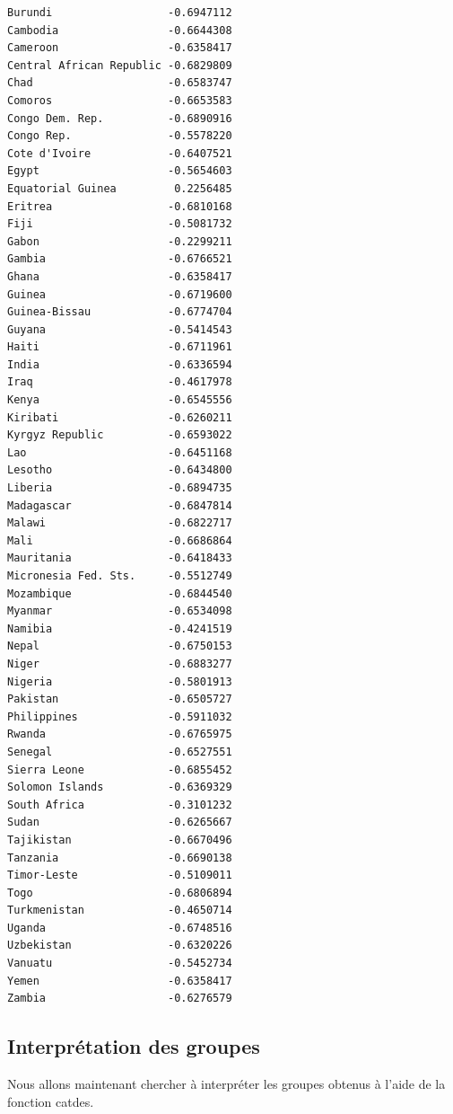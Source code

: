 \documentclass[
]{article}
\begin{document}
\begin{verbatim}
Burundi                  -0.6947112
Cambodia                 -0.6644308
Cameroon                 -0.6358417
Central African Republic -0.6829809
Chad                     -0.6583747
Comoros                  -0.6653583
Congo Dem. Rep.          -0.6890916
Congo Rep.               -0.5578220
Cote d'Ivoire            -0.6407521
Egypt                    -0.5654603
Equatorial Guinea         0.2256485
Eritrea                  -0.6810168
Fiji                     -0.5081732
Gabon                    -0.2299211
Gambia                   -0.6766521
Ghana                    -0.6358417
Guinea                   -0.6719600
Guinea-Bissau            -0.6774704
Guyana                   -0.5414543
Haiti                    -0.6711961
India                    -0.6336594
Iraq                     -0.4617978
Kenya                    -0.6545556
Kiribati                 -0.6260211
Kyrgyz Republic          -0.6593022
Lao                      -0.6451168
Lesotho                  -0.6434800
Liberia                  -0.6894735
Madagascar               -0.6847814
Malawi                   -0.6822717
Mali                     -0.6686864
Mauritania               -0.6418433
Micronesia Fed. Sts.     -0.5512749
Mozambique               -0.6844540
Myanmar                  -0.6534098
Namibia                  -0.4241519
Nepal                    -0.6750153
Niger                    -0.6883277
Nigeria                  -0.5801913
Pakistan                 -0.6505727
Philippines              -0.5911032
Rwanda                   -0.6765975
Senegal                  -0.6527551
Sierra Leone             -0.6855452
Solomon Islands          -0.6369329
South Africa             -0.3101232
Sudan                    -0.6265667
Tajikistan               -0.6670496
Tanzania                 -0.6690138
Timor-Leste              -0.5109011
Togo                     -0.6806894
Turkmenistan             -0.4650714
Uganda                   -0.6748516
Uzbekistan               -0.6320226
Vanuatu                  -0.5452734
Yemen                    -0.6358417
Zambia                   -0.6276579
\end{verbatim}

\hypertarget{interpruxe9tation-des-groupes-1}{%
\subsection{Interprétation des
groupes}\label{interpruxe9tation-des-groupes-1}}

Nous allons maintenant chercher à interpréter les groupes obtenus à
l'aide de la fonction catdes.
\end{document}
